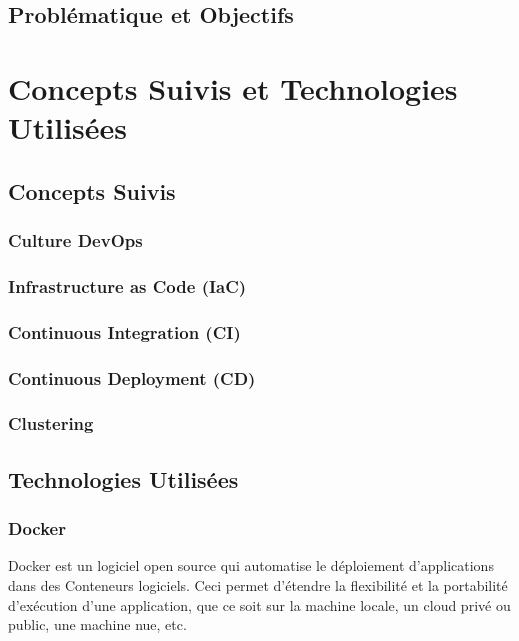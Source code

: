 \documentclass[a4paper,11pt,oneside]{report}
\begin{document}
\section{Problématique et Objectifs}

\newpage

\chapter{Concepts Suivis et Technologies Utilisées}

\newpage

\section{Concepts Suivis}

\subsection{Culture DevOps}

\subsection{Infrastructure as Code (IaC)}

\subsection{Continuous Integration (CI)}

\subsection{Continuous Deployment (CD)}

\subsection{Clustering}

\section{Technologies Utilisées}

\subsection{Docker}
Docker est un logiciel open source qui automatise le déploiement d'applications dans des Conteneurs logiciels. Ceci permet d'étendre la flexibilité et la portabilité d’exécution d'une application, que ce soit sur la machine locale, un cloud privé ou public, une machine nue, etc. 
\newline
\end{document}
